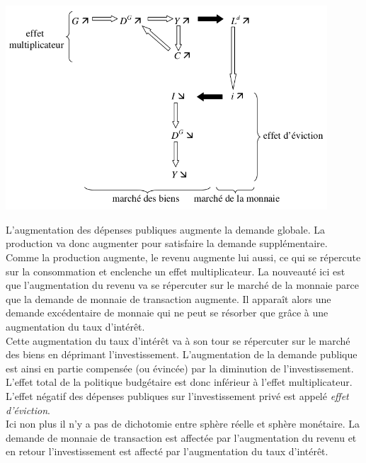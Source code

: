 \documentclass[10pt]{book}
\begin{document}
\begin{center}
  \includegraphics[width=12cm]{graph38.png}
\end{center}
L'augmentation des dépenses publiques augmente la demande globale. La production va donc augmenter pour satisfaire la demande supplémentaire. Comme la production augmente, le revenu augmente lui aussi, ce qui se répercute sur la consommation et enclenche un effet multiplicateur. La nouveauté ici est que l'augmentation du revenu va se répercuter sur le marché de la monnaie parce que la demande de monnaie de transaction augmente. Il apparaît alors une demande excédentaire de monnaie qui ne peut se résorber que grâce à une augmentation du taux d'intérêt. \\
Cette augmentation du taux d'intérêt va à son tour se répercuter sur le marché des biens en déprimant l'investissement. L'augmentation de la demande publique est ainsi en partie compensée (ou évincée) par la diminution de l'investissement. L'effet total de la politique budgétaire est donc inférieur à l'effet multiplicateur. \\
L'effet négatif des dépenses publiques sur l'investissement privé est appelé \textit{effet d'éviction}. \\
Ici non plus il n'y a pas de dichotomie entre sphère réelle et sphère monétaire. La demande de monnaie de transaction est affectée par l'augmentation du revenu et en retour l'investissement est affecté par l'augmentation du taux d'intérêt.
\end{document}
